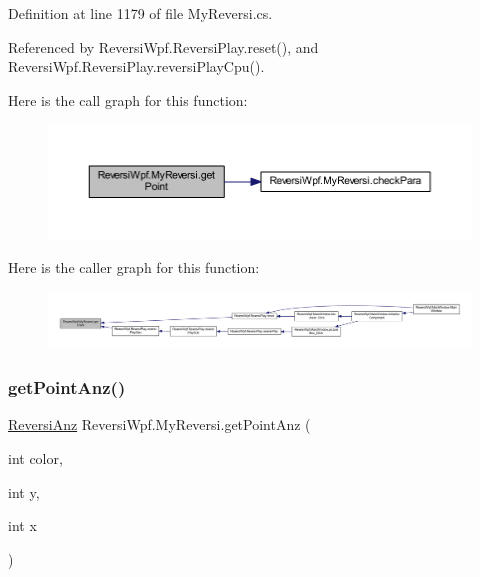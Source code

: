 Definition at line 1179 of file My\+Reversi.\+cs.



Referenced by Reversi\+Wpf.\+Reversi\+Play.\+reset(), and Reversi\+Wpf.\+Reversi\+Play.\+reversi\+Play\+Cpu().

Here is the call graph for this function\+:
\nopagebreak
\begin{figure}[H]
\begin{center}
\leavevmode
\includegraphics[width=350pt]{class_reversi_wpf_1_1_my_reversi_a4e31d8df5c6759c2f6afea00f8332706_cgraph}
\end{center}
\end{figure}
Here is the caller graph for this function\+:
\nopagebreak
\begin{figure}[H]
\begin{center}
\leavevmode
\includegraphics[width=350pt]{class_reversi_wpf_1_1_my_reversi_a4e31d8df5c6759c2f6afea00f8332706_icgraph}
\end{center}
\end{figure}
\mbox{\label{class_reversi_wpf_1_1_my_reversi_af60c852859185c303ebd4d9b5b3f8700}} 
\subsubsection{\texorpdfstring{get\+Point\+Anz()}{getPointAnz()}}
{\footnotesize\ttfamily \hyperlink{class_reversi_wpf_1_1_reversi_anz}{Reversi\+Anz} Reversi\+Wpf.\+My\+Reversi.\+get\+Point\+Anz (\begin{DoxyParamCaption}\item[{int}]{color,  }\item[{int}]{y,  }\item[{int}]{x }\end{DoxyParamCaption})}



